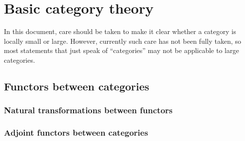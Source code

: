 \nocite{*}

\section{Basic category theory}









\begin{convention}
    In this document, care should be taken to make it clear whether a category is locally small or large. However, currently such care has not been fully taken, so most statements that just speak of ``categories'' may not be applicable to large categories.
\end{convention}




\subsection{Functors between categories}



\subsubsection{Natural transformations between functors}


\subsubsection{Adjoint functors between categories}






